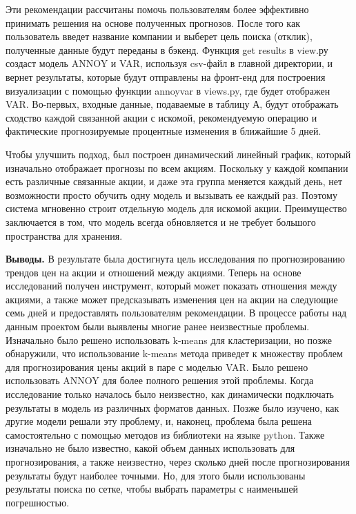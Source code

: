 \begin{multicols}{2}
Эти рекомендации рассчитаны помочь пользователям более эффективно
принимать решения на основе полученных прогнозов. После того как
пользователь введет название компании и выберет цель поиска (отклик),
полученные данные будут переданы в бэкенд. Функция get results в view.ру
создаст модель ANNOY и VAR, используя csv-файл в главной директории, и
вернет результаты, которые будут отправлены на фронт-енд для построения
визуализации с помощью функции annoyvar в views.py, где будет отображен
VAR. Во-первых, входные данные, подаваемые в таблицу А, будут отображать
сходство каждой связанной акции с искомой, рекомендуемую операцию и
фактические прогнозируемые процентные изменения в ближайшие 5 дней.

Чтобы улучшить подход, был построен динамический линейный график,
который изначально отображает прогнозы по всем акциям. Поскольку у
каждой компании есть различные связанные акции, и даже эта группа
меняется каждый день, нет возможности просто обучить одну модель и
вызывать ее каждый раз. Поэтому система мгновенно строит отдельную
модель для искомой акции. Преимущество заключается в том, что модель
всегда обновляется и не требует большого пространства для хранения.

{\bfseries Выводы.} В результате была достигнута цель исследования по
прогнозированию трендов цен на акции и отношений между акциями. Теперь
на основе исследований получен инструмент, который может показать
отношения между акциями, а также может предсказывать изменения цен на
акции на следующие семь дней и предоставлять пользователям рекомендации.
В процессе работы над данным проектом были выявлены многие ранее
неизвестные проблемы. Изначально было решено использовать k-means для
кластеризации, но позже обнаружили, что использование k-means метода
приведет к множеству проблем для прогнозирования цены акций в паре с
моделью VAR. Было решено использовать ANNOY для более полного решения
этой проблемы. Когда исследование только началось было неизвестно, как
динамически подключать результаты в модель из различных форматов данных.
Позже было изучено, как другие модели решали эту проблему, и, наконец,
проблема была решена самостоятельно с помощью методов из библиотеки на
языке python. Также изначально не было известно, какой объем данных
использовать для прогнозирования, а также неизвестно, через сколько дней
после прогнозирования результаты будут наиболее точными. Но, для этого
были использованы результаты поиска по сетке, чтобы выбрать параметры с
наименьшей погрешностью.


\end{multicols}

